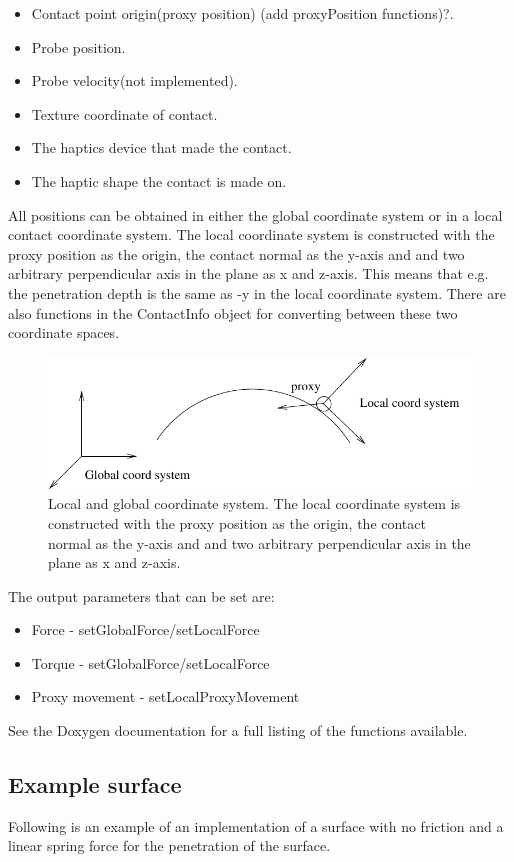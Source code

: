 \begin{itemize}
\item Contact point origin(proxy position) (add proxyPosition functions)?.
\item Probe position.
\item Probe velocity(not implemented).
\item Texture coordinate of contact.
\item The haptics device that made the contact.
\item The haptic shape the contact is made on.
\end{itemize}


All positions can be obtained in either the global coordinate system or
in a local contact coordinate system. The local coordinate system is constructed with the proxy position as the origin, the contact normal as the y-axis and and two arbitrary perpendicular axis in the plane as x and z-axis. This means that e.g. the penetration depth is the same as -y in the local coordinate system. There are also functions in the ContactInfo object for converting between these two coordinate spaces. 

\begin{figure} 
  \centering 
  \includegraphics{images/coordsystems.pdf}
  \caption{Local and global coordinate system. The local coordinate system is constructed with the proxy position as the origin, the contact normal as the y-axis and and two arbitrary perpendicular axis in the plane as x and z-axis.}
  \label{coordsystems} 
\end{figure}

The output parameters that can be set are:

\begin{itemize}
\item Force - setGlobalForce/setLocalForce
\item Torque - setGlobalForce/setLocalForce
\item Proxy movement - setLocalProxyMovement
\end{itemize}

See the Doxygen documentation for a full listing of the functions available.

\subsection{Example surface}
Following is an example of an implementation of a surface with no friction and a linear spring force for the penetration of the surface.   




